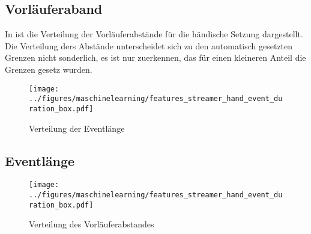 \subsection{Vorläuferaband}
In  ist die Verteilung der Vorläuferabstände für die händische Setzung dargestellt. Die Verteilung ders Abstände unterscheidet sich zu den automatisch gesetzten Grenzen nicht sonderlich, es ist nur zuerkennen, das für einen kleineren Anteil die Grenzen gesetz wurden.

\begin{figure}[H]
    \centering
      \texttt{[image: ../figures/maschinelearning/features\_streamer\_hand\_event\_duration\_box.pdf]}
      \caption{Verteilung der Eventlänge}
      \label{fig:streamer_hand_event_duration_box}
\end{figure}


\begin{table}[h!]
\centering
\caption{Model Performance für die Vorhersage der Vorläuferabstände}
\end{table}

\subsection{Eventlänge}

\begin{figure}[H]
    \centering
      \texttt{[image: ../figures/maschinelearning/features\_streamer\_hand\_event\_duration\_box.pdf]}
      \caption{Verteilung des Vorläuferabstandes}
      \label{fig:streamer_hand_prec_distance_box}
\end{figure}



